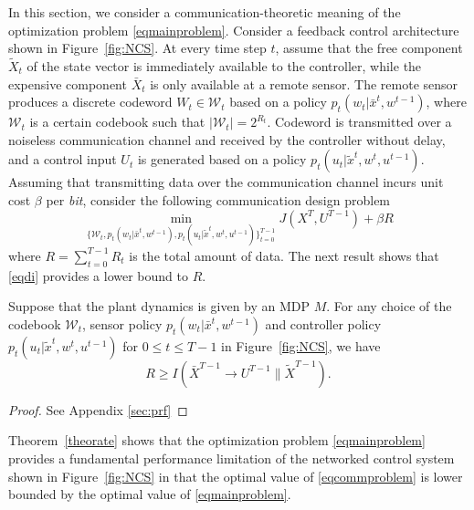 
In this section, we consider a communication-theoretic meaning of the optimization problem \eqref{eqmainproblem}. Consider a feedback control architecture shown in Figure~\ref{fig:NCS}. 
At every time step $t$, assume that the free component $\tilde{X}_t$ of the state vector is immediately available to the controller, while the expensive component $\bar{X}_t$ is only available at a remote sensor. The remote sensor produces a discrete codeword $W_t\in\mathcal{W}_t$ based on a policy $p_t(w_t|\bar{x}^t, w^{t-1})$, where $\mathcal{W}_t$ is a certain codebook such that $|\mathcal{W}_t|=2^{R_t}$. Codeword is transmitted over a noiseless communication channel and received by the controller without delay, and a control input $U_t$ is generated based on a policy $p_t(u_t|\tilde{x}^t, w^t, u^{t-1})$.
Assuming that transmitting data over the communication channel incurs unit cost $\beta$ per \emph{bit}, consider the following communication design problem
\begin{equation}
\min_{\{\mathcal{W}_t, p_t(w_t|\bar{x}^t, w^{t-1}), p_t(u_t|\tilde{x}^t, w^t, u^{t-1}) \}_{t=0}^{T-1}}  J(X^T, U^{T-1}) +\beta R \label{eqcommproblem}
\end{equation}
where $R=\sum_{t=0}^{T-1}R_t$ is the total amount of data. 
The next result shows that \eqref{eqdi} provides a lower bound to $R$.
\begin{theorem}
\label{theorate}
Suppose that the plant dynamics is given by an MDP $M$. For any choice of the codebook $\mathcal{W}_t$, sensor policy $p_t(w_t|\bar{x}^t, w^{t-1})$ and controller policy $p_t(u_t|\tilde{x}^t, w^t, u^{t-1})$ for $0\leq t\leq T-1$ in Figure~\ref{fig:NCS}, we have
\[
R \geq I(\bar{X}^{T-1}\rightarrow U^{T-1}\| \tilde{X}^{T-1}).
\]
\end{theorem}
\begin{proof}
See Appendix \ref{sec:prf}
\end{proof}
Theorem~\ref{theorate} shows that the optimization problem \eqref{eqmainproblem} provides a fundamental performance limitation of the networked control system shown in Figure~\ref{fig:NCS} in that the optimal value of \eqref{eqcommproblem} is lower bounded by the optimal value of \eqref{eqmainproblem}.




